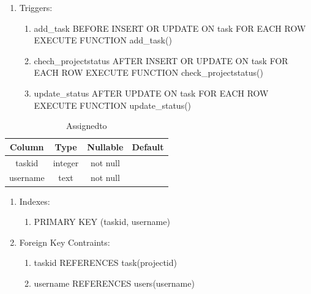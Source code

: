 \documentclass[conference]{IEEEtran}
\begin{document}
\begin{table}[htbp]
\begin{center}
\begin{enumerate}
    \item Triggers:
      \begin{enumerate}
        \item add\_task BEFORE INSERT OR UPDATE ON task FOR EACH ROW EXECUTE FUNCTION add\_task()
        \item chech\_projectstatus AFTER INSERT OR UPDATE ON task FOR EACH ROW EXECUTE FUNCTION check\_projectstatus()
        \item update\_status AFTER UPDATE ON task FOR EACH ROW EXECUTE FUNCTION update\_status()
      \end{enumerate}
    \end{enumerate}
    \label{task}
  \end{center}
\end{table}

\begin{table}[htbp]
  \caption{Assignedto}
  \begin{center}
    \begin{tabular}{|c|c|c|c|}
      \hline
      \textbf{Column} & \textbf{Type} & \textbf{Nullable} & \textbf{Default}\\
      \hline
      taskid & integer & not null &\\
      username & text & not null &\\
      \hline
    \end{tabular}
    \begin{enumerate}
    \item Indexes:
      \begin{enumerate}
      \item PRIMARY KEY (taskid, username)
      \end{enumerate}
    \item Foreign Key Contraints:
      \begin{enumerate}
      \item taskid REFERENCES task(projectid)
      \item username REFERENCES users(username)
      \end{enumerate}
    \end{enumerate}
    \label{assignedto}
  \end{center}
\end{table}
\end{document}
